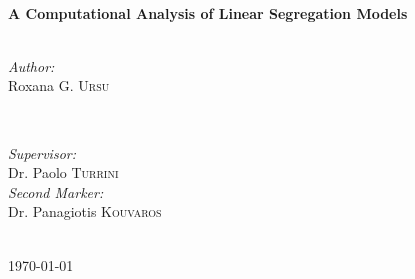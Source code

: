 \documentclass[twoside,openright]{article}
\begin{document}
\begin{titlepage}

\HRule \\[0.4cm]
{ \huge \bfseries A Computational Analysis of Linear Segregation Models}\\[0.4cm] %
\HRule \\[1.5cm]
 

\begin{minipage}{0.5\textwidth}
\begin{flushleft} \large
\emph{Author:}\\
Roxana G. \textsc{Ursu}\\
\end{flushleft}
\end{minipage} 
~
\begin{minipage}{0.4\textwidth}
\begin{flushright} \large
\emph{Supervisor:} \\
Dr. Paolo  \textsc{Turrini}\\ %
\emph{Second Marker:} \\
Dr. Panagiotis  \textsc{Kouvaros}
\end{flushright}
\end{minipage}\\[4cm]



{\large \today}\\[3cm] %


\vfill %

\end{titlepage}
\end{document}
